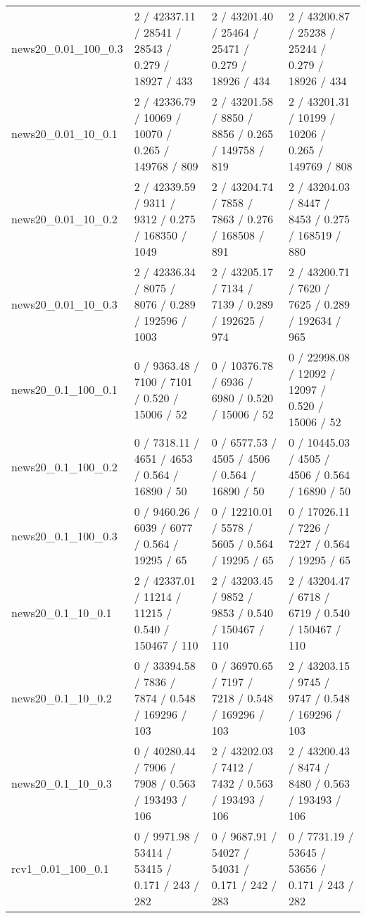 \begin{tabular}{llll}
       news20\_0.01\_100\_0.3 &  2 / 42337.11 /  28541 /   28543 / 0.279 /  18927 /    433 &  2 / 43201.40 /  25464 /   25471 / 0.279 /  18926 /    434 &  2 / 43200.87 /  25238 /   25244 / 0.279 /  18926 /    434 \\
        news20\_0.01\_10\_0.1 &  2 / 42336.79 /  10069 /   10070 / 0.265 / 149768 /    809 &  2 / 43201.58 /   8850 /    8856 / 0.265 / 149758 /    819 &  2 / 43201.31 /  10199 /   10206 / 0.265 / 149769 /    808 \\
        news20\_0.01\_10\_0.2 &  2 / 42339.59 /   9311 /    9312 / 0.275 / 168350 /   1049 &  2 / 43204.74 /   7858 /    7863 / 0.276 / 168508 /    891 &  2 / 43204.03 /   8447 /    8453 / 0.275 / 168519 /    880 \\
        news20\_0.01\_10\_0.3 &  2 / 42336.34 /   8075 /    8076 / 0.289 / 192596 /   1003 &  2 / 43205.17 /   7134 /    7139 / 0.289 / 192625 /    974 &  2 / 43200.71 /   7620 /    7625 / 0.289 / 192634 /    965 \\
        news20\_0.1\_100\_0.1 &   0 / 9363.48 /   7100 /    7101 / 0.520 /  15006 /     52 &  0 / 10376.78 /   6936 /    6980 / 0.520 /  15006 /     52 &  0 / 22998.08 /  12092 /   12097 / 0.520 /  15006 /     52 \\
        news20\_0.1\_100\_0.2 &   0 / 7318.11 /   4651 /    4653 / 0.564 /  16890 /     50 &   0 / 6577.53 /   4505 /    4506 / 0.564 /  16890 /     50 &  0 / 10445.03 /   4505 /    4506 / 0.564 /  16890 /     50 \\
        news20\_0.1\_100\_0.3 &   0 / 9460.26 /   6039 /    6077 / 0.564 /  19295 /     65 &  0 / 12210.01 /   5578 /    5605 / 0.564 /  19295 /     65 &  0 / 17026.11 /   7226 /    7227 / 0.564 /  19295 /     65 \\
         news20\_0.1\_10\_0.1 &  2 / 42337.01 /  11214 /   11215 / 0.540 / 150467 /    110 &  2 / 43203.45 /   9852 /    9853 / 0.540 / 150467 /    110 &  2 / 43204.47 /   6718 /    6719 / 0.540 / 150467 /    110 \\
         news20\_0.1\_10\_0.2 &  0 / 33394.58 /   7836 /    7874 / 0.548 / 169296 /    103 &  0 / 36970.65 /   7197 /    7218 / 0.548 / 169296 /    103 &  2 / 43203.15 /   9745 /    9747 / 0.548 / 169296 /    103 \\
         news20\_0.1\_10\_0.3 &  0 / 40280.44 /   7906 /    7908 / 0.563 / 193493 /    106 &  2 / 43202.03 /   7412 /    7432 / 0.563 / 193493 /    106 &  2 / 43200.43 /   8474 /    8480 / 0.563 / 193493 /    106 \\
         rcv1\_0.01\_100\_0.1 &   0 / 9971.98 /  53414 /   53415 / 0.171 /    243 /    282 &   0 / 9687.91 /  54027 /   54031 / 0.171 /    242 /    283 &   0 / 7731.19 /  53645 /   53656 / 0.171 /    243 /    282 \\

\end{tabular}
